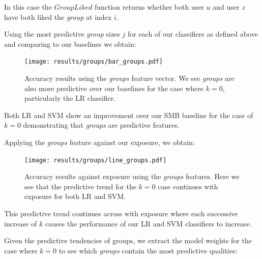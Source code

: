 In this case the $GroupLiked$ function returns whether both user $u$ and user $z$ have both liked the \emph{group} at index $i$.

Using the most predictive \emph{group} sizes $j$ for each of our classifiers as defined above and comparing to our baselines we obtain:

\begin{figure}[h]
	\begin{center}
		\texttt{[image: results/groups/bar\_groups.pdf]}
		\caption{Accuracy results using the \emph{groups} feature vector. We see \emph{groups} are also more predictive over our baselines 
				 for the case where $k=0$, particularly the LR classifier.}
	\end{center}
\end{figure}

Both LR and SVM show an improvement over our SMB baseline for the case of $k = 0$ demonstrating that \emph{groups} are predictive features.

\clearpage

Applying the \emph{groups} feature against our exposure, we obtain:

\begin{figure}[h]
	\begin{center}
		\texttt{[image: results/groups/line\_groups.pdf]}
		\caption{Accuracy results against exposure using the \emph{groups} features. Here we see that the predictive trend for the $k=0$
				 case continues with exposure for both LR and SVM.}
	\end{center}
\end{figure}

This predictive trend continues across with exposure where each successive increase of $k$ causes the performance of our LR and SVM 
classifiers to increase.

\clearpage

Given the predictive tendencies of groups, we extract the model weights for the case where $k=0$ to see which \emph{groups} 
contain the most predictive qualities:

